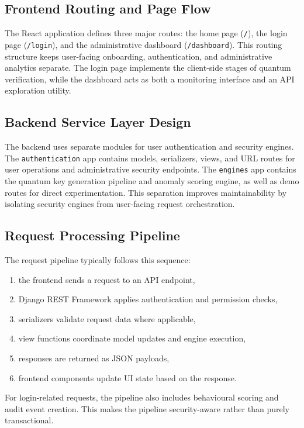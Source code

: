 \subsection{Frontend Routing and Page Flow}
The React application defines three major routes: the home page (\texttt{/}), the login page (\texttt{/login}), and the administrative dashboard (\texttt{/dashboard}). This routing structure keeps user-facing onboarding, authentication, and administrative analytics separate. The login page implements the client-side stages of quantum verification, while the dashboard acts as both a monitoring interface and an API exploration utility.

\subsection{Backend Service Layer Design}
The backend uses separate modules for user authentication and security engines. The \texttt{authentication} app contains models, serializers, views, and URL routes for user operations and administrative security endpoints. The \texttt{engines} app contains the quantum key generation pipeline and anomaly scoring engine, as well as demo routes for direct experimentation. This separation improves maintainability by isolating security engines from user-facing request orchestration.

\subsection{Request Processing Pipeline}
The request pipeline typically follows this sequence:

\begin{enumerate}
    \item the frontend sends a request to an API endpoint,
    \item Django REST Framework applies authentication and permission checks,
    \item serializers validate request data where applicable,
    \item view functions coordinate model updates and engine execution,
    \item responses are returned as JSON payloads,
    \item frontend components update UI state based on the response.
\end{enumerate}

For login-related requests, the pipeline also includes behavioural scoring and audit event creation. This makes the pipeline security-aware rather than purely transactional.

